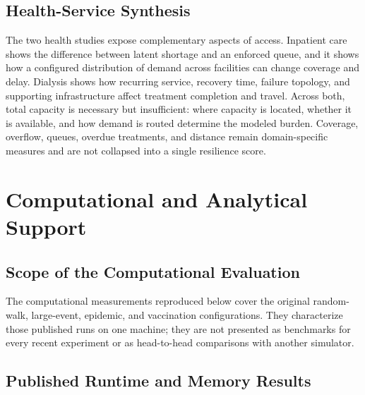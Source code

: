\documentclass[pdflatex,sn-mathphys-num]{sn-jnl}%
\theoremstyle{thmstyleone}%
\theoremstyle{thmstyletwo}%
\theoremstyle{thmstylethree}%
\begin{document}
\subsection{Health-Service Synthesis}
The two health studies expose complementary aspects of access. Inpatient care shows the difference between latent shortage and an enforced queue, and it shows how a configured distribution of demand across facilities can change coverage and delay. Dialysis shows how recurring service, recovery time, failure topology, and supporting infrastructure affect treatment completion and travel. Across both, total capacity is necessary but insufficient: where capacity is located, whether it is available, and how demand is routed determine the modeled burden. Coverage, overflow, queues, overdue treatments, and distance remain domain-specific measures and are not collapsed into a single resilience score.



\section{Computational and Analytical Support}
\label{sec:computational_analysis}
\label{sec:visualization}

\subsection{Scope of the Computational Evaluation}

The computational measurements reproduced below cover the original random-walk, large-event, epidemic, and vaccination configurations. They characterize those published runs on one machine; they are not presented as benchmarks for every recent experiment or as head-to-head comparisons with another simulator.

\subsection{Published Runtime and Memory Results}
\label{sec:quant_perf}
\end{document}
